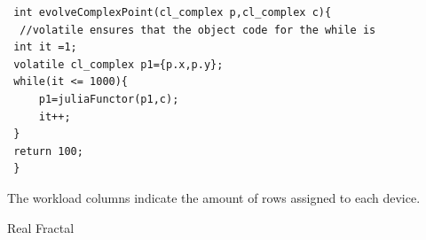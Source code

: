  \begin{lstlisting}
 int evolveComplexPoint(cl_complex p,cl_complex c){
  //volatile ensures that the object code for the while is 
 int it =1;
 volatile cl_complex p1={p.x,p.y};
 while(it <= 1000){
	 p1=juliaFunctor(p1,c);
	 it++;
 }
 return 100;
 }
 \end{lstlisting}
 
 
\begin{table}[!htb]
	\small
	\caption{The workload columns indicate the amount of rows assigned to each device. }
	\label{tab:julia_two_GPU}
	\begin{subtable}{.5\linewidth}
		\centering
		\caption{Real Fractal}
		

\end{subtable}
\end{table}
